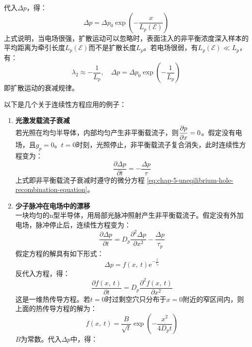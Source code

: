 代入$\Delta p$，得：
\begin{equation}
    \Delta p=\Delta p_0\exp{\left(-\frac{x}{L_p(\mathscr{E})}\right)}
\end{equation}
上式说明，当电场很强，扩散运动可以忽略时，表面注入的非平衡浓度深入样本的平均距离为牵引长度$L_p(\mathscr{E})$而不是扩散长度$L_p$。若电场很弱，有$L_p(\mathscr{E})\ll L_p$，有：
\begin{equation}
    \lambda_2\approx-\frac{1}{L_p},\quad \Delta p=\Delta p_0\exp{\left(-\frac{1}{L_p}\right)}
\end{equation}
即扩散运动的衰减规律。

以下是几个关于连续性方程应用的例子：
\begin{enumerate}
    \item \textbf{光激发载流子衰减}\\
    若光照在均匀半导体，内部均匀产生非平衡载流子，则$\displaystyle\frac{\partial p}{\partial x}=0$。假定没有电场，且$g_p=0$。$t=0$时刻，光照停止，非平衡载流子复合消失，此时连续性方程变为：
    \begin{equation}
        \frac{\partial \Delta p}{\partial t}=-\frac{\Delta p}{\tau}
    \end{equation}
    上式即非平衡载流子衰减时遵守的微分方程 \autoref{eq:chap-5-uneqilibrium-hole-recombination-equation}。
    \item \textbf{少子脉冲在电场中的漂移}\\
    一块均匀的n型半导体，用局部光脉冲照射产生非平衡载流子。假定没有外加电场，脉冲停止后，连续性方程变为：
    \begin{equation}
        \frac{\partial \Delta p}{\partial t}=D_p\frac{\partial^2 \Delta p}{\partial x^2}-\frac{\Delta p}{\tau_p}
    \end{equation}
    假定方程的解具有如下形式：
    \begin{equation}
        \Delta p=f(x,\ t)\mathrm{e}^{-\frac{t}{\tau_p}}
    \end{equation}
    反代入方程，得：
    \begin{equation}
        \frac{\partial f(x,\ t)}{\partial t}=D_p\frac{\partial^2 f(x,\ t)}{\partial x^2}
    \end{equation}
    这是一维热传导方程。若$t=0$时过剩空穴只分布于$x=0$附近的窄区间内，则上面的热传导方程的解为：
    \begin{equation}
        f(x,\ t)=\frac{B}{\sqrt{t}}\exp{\left(-\frac{x^2}{4D_pt}\right)}
    \end{equation}
    $B$为常数。代入$\Delta p$中，得：
    \begin{equation}

\end{equation}
\end{enumerate}
